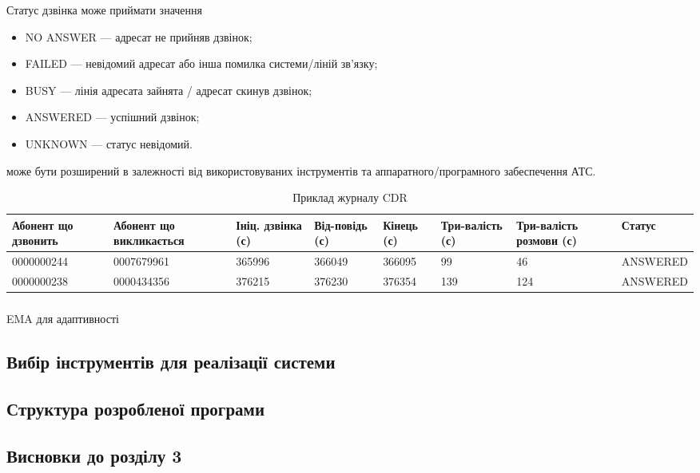   Статус дзвінка може приймати значення

  \begin{itemize}
    \item NO ANSWER --- адресат не прийняв дзвінок;
    \item FAILED --- невідомий адресат або інша помилка системи/ліній зв'язку;
    \item BUSY --- лінія адресата зайнята / адресат скинув дзвінок;
    \item ANSWERED --- успішний дзвінок;
    \item UNKNOWN --- статус невідомий.
  \end{itemize}

  може бути розширений в залежності від використовуваних інструментів та аппаратного/програмного забеспечення АТС.

  \begin{table}[h]
  \footnotesize
  \caption{Приклад журналу CDR}
        \begin{tabularx}{\textwidth}{| X | X | X | X | X | X | X | X |}
          \hline
          Абонент що дзвонить & Абонент що викликається & Ініц. дзвінка (с) & Від-повідь (с) & Кінець (с) & Три-валість (с) & Три-валість розмови (с) & Статус \\ \hline
          \scriptsize{0000000244} & \scriptsize{0007679961} & 365996 & 366049 & 366095 & 99 & 46 & \scriptsize{ANSWERED} \\ \hline
          \scriptsize{0000000238} & \scriptsize{0000434356} & 376215 & 376230 & 376354 & 139 & 124 & \scriptsize{ANSWERED}  \\ \hline
      \end{tabularx}
      \label{tab:cdr-log-example}
  \end{table}

\subsubsection{\TBD}

EMA для адаптивності


\subsection{Вибір інструментів для реалізації системи}
    \TBD

\subsection{Структура розробленої програми}
    \TBD


\newpage
\subsection*{Висновки до розділу 3}
    \TBD
